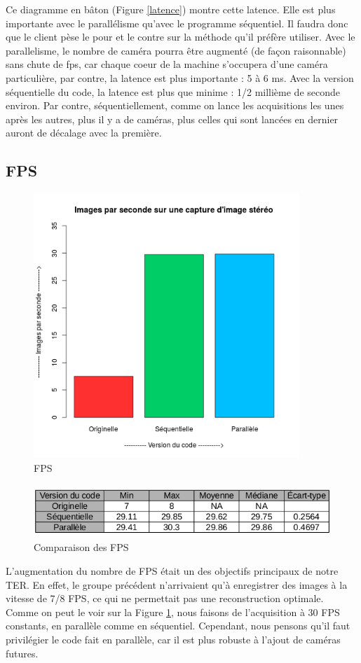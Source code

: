 Ce diagramme en bâton (Figure \ref{latence}) montre cette latence. Elle est plus importante avec le parallélisme qu'avec le programme séquentiel. Il faudra donc que le client pèse le pour et le contre sur la méthode qu'il préfère utiliser. Avec le parallelisme, le nombre de caméra pourra être augmenté (de façon raisonnable) sans chute de fps, car chaque coeur de la machine s'occupera d'une caméra particulière, par contre, la latence est plus importante : 5 à 6 ms. Avec la version séquentielle du code, la latence est plus que minime : 1/2 millième de seconde environ. Par contre, séquentiellement, comme on lance les acquisitions les unes après les autres, plus il y a de caméras, plus celles qui sont lancées en dernier auront de décalage avec la première.

\subsection{FPS}

\begin{figure}[!h]
\centering
\includegraphics[width=\textwidth, height=10cm]{Modules/Picture/fps.png}
\caption{FPS}
\label{fps}
\end{figure}

\begin{figure}[!h]
\centering
\includegraphics[width=\textwidth, height=2cm]{Modules/Picture/tableauFPS.png}
\caption{Comparaison des FPS}
\end{figure}

L'augmentation du nombre de FPS était un des objectifs principaux de notre TER. En effet, le groupe précédent n'arrivaient qu'à enregistrer des images à la vitesse de 7/8 FPS, ce qui ne permettait pas une reconstruction optimale. Comme on peut le voir sur la Figure \ref{fps}, nous faisons de l'acquisition à 30 FPS constants, en parallèle comme en séquentiel. Cependant, nous pensons qu'il faut privilégier le code fait en parallèle, car il est plus robuste à l'ajout de caméras futures.

